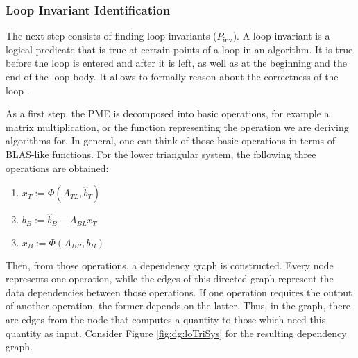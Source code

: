 \subsubsection{Loop Invariant Identification}

The next step consists of finding loop invariants ($P_{\text{inv}}$). A loop invariant is a logical predicate that is true at certain points of a loop in an algorithm. It is true before the loop is entered and after it is left, as well as at the beginning and the end of the loop body. It allows to formally reason about the correctness of the loop \cite{GrSc:92}.

As a first step, the PME is decomposed into basic operations, for example a matrix multiplication, or the function representing the operation we are deriving algorithms for. In general, one can think of those basic operations in terms of BLAS-like functions. For the lower triangular system, the following three operations are obtained:
%
\begin{enumerate}
\item $x_T := \Phi \left( A_{TL}, \hat{b}_T \right)$
\item $b_B := \hat{b}_B - A_{BL} x_T$
\item $x_B := \Phi \left( A_{BR}, b_B \right)$
\end{enumerate}
%
Then, from those operations, a dependency graph is constructed. Every node represents one operation, while the edges of this directed graph represent the data dependencies between those operations. If one operation requires the output of another operation, the former depends on the latter. Thus, in the graph, there are edges from the node that computes a quantity to those which need this quantity as input. Consider Figure \ref{fig:dg:loTriSys} for the resulting dependency graph.
%
